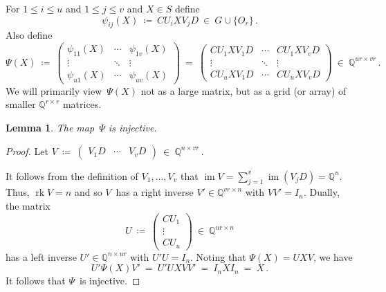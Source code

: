 \documentclass{lmcs}
\newtheorem{lemma}[thm]{Lemma}
\theoremstyle{definition}
\DeclareMathOperator{\im}{im}
\newcommand{\rk}{\operatorname{rk}}
\newcommand{\Q}{\mathbb{Q}}
\begin{document}
For $1 \le i \le u$ and $1 \le j \le v$ and $X \in S$ define
\[
 \psi_{i j}(X) \ \coloneqq \ C U_i X V_j D \ \in \ G \cup \{O_r\}\,.
\]
Also define
\[
 \Psi(X) \ \coloneqq \ \begin{pmatrix} \psi_{1 1}(X) & \cdots & \psi_{1 v}(X) \\
                                \vdots        & \ddots & \vdots\\
                                \psi_{u 1}(X) & \cdots & \psi_{u v}(X)
                \end{pmatrix} \ = \ 
                \begin{pmatrix} C U_1 X V_1 D & \cdots & C U_1 X V_v D \\
                                \vdots        & \ddots & \vdots\\
                                C U_u X V_1 D & \cdots & C U_u X V_v D
                \end{pmatrix} \ \in \ \Q^{u r \times v r}\,.
\]
We will primarily view~$\Psi(X)$ not as a large matrix, but as a grid (or array) of smaller $\Q^{r \times r}$ matrices.

\begin{lemma} \label{lem:Psi-injective}
The map~$\Psi$ is injective.
\end{lemma}
\begin{proof}
Let 
$
 V \ \coloneqq \ \begin{pmatrix} V_1 D & \cdots & V_v D \end{pmatrix} \ \in \ \Q^{n \times v r}\,.
$

It follows from the definition of $V_1, \ldots, V_v$ that $\im V = \sum_{j=1}^v \im(V_j D) = \Q^n$.
Thus, $\rk V = n$ and so $V$~has a right inverse $V' \in \Q^{v r \times n}$ with $V V' = I_n$.
Dually, the matrix
\[
 U \ \coloneqq \ \begin{pmatrix} C U_1 \\ \vdots \\ C U_u \end{pmatrix} \ \in \ \Q^{u r \times n}
\]
has a left inverse $U' \in \Q^{n \times u r}$ with $U' U = I_n$.
Noting that $\Psi(X) = U X V$, we have
\[
 U' \Psi(X) V' \ = \ U' U X V V' \ = \ I_n X I_n \ = \ X\,.
\]
It follows that $\Psi$~is injective.
\end{proof}
\end{document}
